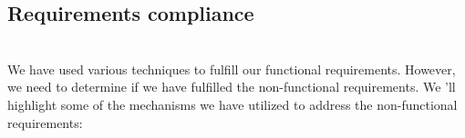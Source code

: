 

\subsection{Requirements compliance}\label{xesAI2MOJEYpW9qCoEyk3}
\\
We have used various techniques to fulfill our functional requirements. However, we need to determine if we have fulfilled the non-functional requirements. We 'll highlight some of the mechanisms we have utilized to address the non-functional requirements:

